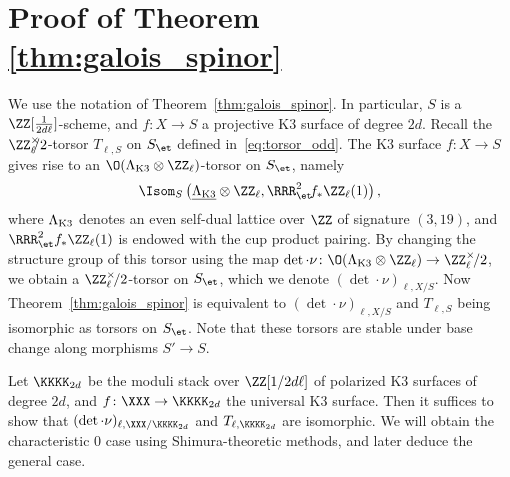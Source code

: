 \section{Proof of Theorem \ref{thm:galois_spinor}}\label{sec:prf_galois_spinor}
We use the notation of Theorem~\ref{thm:galois_spinor}. In particular, $S$ is a $\ZZ[\tfrac{1}{2d \ell}]$-scheme, and $f\colon X \rightarrow S$ a projective K3 surface of degree $2d$. Recall the $\ZZ_{\ell}^{\times}\hspace{-5pt}/2$-torsor $T_{\ell,S}$ on $S_{\et}$ defined in~\eqref{eq:torsor_odd}. The K3 surface $f\colon X \rightarrow S$ gives rise to an $\O(\Lambda_{\textnormal{K3}} \otimes \ZZ_{\ell})$-torsor on $S_{\et}$, namely
$$
\Isom_S\left(\underline{\Lambda_{\textnormal{K3}}}\otimes \ZZ_{\ell}, \RRR_{\et}^2\!f_* \ZZ_{\ell}(1)\right),
$$
where $\Lambda_{\textnormal{K3}}$ denotes an even self-dual lattice over $\ZZ$ of signature $(3,19)$, and $\RRR^2_{\et}f_* \ZZ_{\ell}(1)$ is endowed with the cup product pairing. By changing the structure group of this torsor using the map $\det \cdot \nu\colon \O(\Lambda_{\textnormal{K3}} \otimes \ZZ_{\ell}) \rightarrow \ZZ_{\ell}^{\times}\!/2$, we obtain a $\ZZ_{\ell}^{\times}\!/2$-torsor on $S_{\et}$, which we denote $(\det \cdot \nu)_{\ell,X/S}$. Now Theorem~\ref{thm:galois_spinor} is equivalent to $(\det \cdot \nu)_{\ell,X/S}$ and $T_{\ell,S}$ being isomorphic as torsors on $S_{\et}$. Note that these torsors are stable under base change along morphisms $S' \rightarrow S$.

Let $\KKKK_{2d}$ be the moduli stack over $\ZZ[1/2d\ell]$ of polarized K3 surfaces of degree $2d$, and $f\colon \XXX \rightarrow \KKKK_{2d}$ the universal K3 surface. Then it suffices to show that $(\det \cdot \nu)_{\ell,\XXX/\KKKK_{2d}}$ and $T_{\ell,\KKKK_{2d}}$ are isomorphic. We will obtain the characteristic $0$ case using Shimura-theoretic methods, and later deduce the general case.

